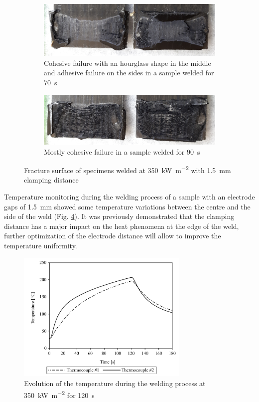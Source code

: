 \documentclass[11pt,review,times]{elsarticle}
\begin{document}
\begin{figure}[htb]
	\center
	\captionsetup{width=125mm}
	\begin{subfigure}{125mm}
		\center
		\captionsetup{width=125mm}
		\includegraphics[width=125mm]{350kW-70-10-150-1UD_crop.jpg}
		\caption{Cohesive failure with an hourglass shape in the middle and adhesive failure on the sides in a sample welded for \SI{70}{\s}}
		\label{fig:fracture_surface_70s}
	\end{subfigure}
	\begin{subfigure}{125mm}
		\center
		\captionsetup{width=125mm}
		\includegraphics[width=125mm]{350kW-90-10-150-3UD_crop.jpg}
		\caption{Mostly cohesive failure in a sample welded for \SI{90}{\s}}
		\label{fig:fracture_surface_90s}
	\end{subfigure}%
	\caption{Fracture surface of specimens welded at \SI{350}{\kW\per\square\metre} with \SI{1.5}{\mm} clamping distance}
	\label{fig:fracture_surface}
\end{figure}

Temperature monitoring during the welding process of a sample with an electrode gaps of \SI{1.5}{\mm} showed some temperature variations between the centre and the side of the weld (Fig. \ref{fig:temp_350kW_120_10_150_3UD}).
It was previously demonstrated that the clamping distance has a major impact on the heat phenomena at the edge of the weld, further optimization of the electrode distance will allow to improve the temperature uniformity. 

\begin{figure}[h]
	\center
	\captionsetup{width=78mm}
	\includegraphics[width=3.25in]{temp_welding_350kw.pdf}
	\caption{Evolution of the temperature during the welding process at \SI{350}{\kilo\watt\per\square\metre} for \SI{120}{\second}}
	\label{fig:temp_350kW_120_10_150_3UD}
\end{figure}
\end{document}
